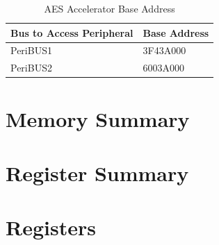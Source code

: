 \documentclass[main\_\_EN.tex]{subfiles}
\begin{document}
\begin{longtable}[c]{ | l | C{3cm} | }
\caption{AES Accelerator Base Address}\label{table:AESENTRY}
\\\hline
{}
    Bus to Access Peripheral      & Base Address\\
    \hline
    PeriBUS1      & \hexprefix{}3F43A000      \\
    \hline
    PeriBUS2     & \hexprefix{}6003A000      \\
    \hline
\end{longtable}
\section{Memory Summary}\label{aesMemorySummary}


\newpage
\hypertarget{aes-reg-summ}{}
\section{ Register Summary }


\newpage
\section{ Registers }

\end{document}
